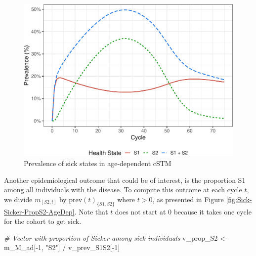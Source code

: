 \documentclass[
]{article}
\newenvironment{Shaded}{\begin{snugshade}}{\end{snugshade}}
\newcommand{\CommentTok}[1]{\textcolor[rgb]{0.56,0.35,0.01}{\textit{#1}}}
\newcommand{\DecValTok}[1]{\textcolor[rgb]{0.00,0.00,0.81}{#1}}
\newcommand{\NormalTok}[1]{#1}
\newcommand{\OtherTok}[1]{\textcolor[rgb]{0.56,0.35,0.01}{#1}}
\newcommand{\SpecialCharTok}[1]{\textcolor[rgb]{0.00,0.00,0.00}{#1}}
\newcommand{\StringTok}[1]{\textcolor[rgb]{0.31,0.60,0.02}{#1}}
\begin{document}
\begin{figure}[H]

{\centering \includegraphics{../figs/Sick-Sicker-Prev-AgeDep-1} 

}

\caption{Prevalence of sick states in age-dependent cSTM}\label{fig:Sick-Sicker-Prev-AgeDep}
\end{figure}

Another epidemiological outcome that could be of interest, is the proportion S1 among all individuals with the disease. To compute this outcome at each cycle \(t\), we divide \(m_{[S2, t]}\) by \(\text{prev}(t)_{\{S1,S2\}}\) where \(t>0\), as presented in Figure \ref{fig:Sick-Sicker-PropS2-AgeDep}. Note that \(t\) does not start at 0 because it takes one cycle for the cohort to get sick.

\begin{Shaded}
\begin{Highlighting}[]
\CommentTok{\# Vector with proportion of Sicker among sick individuals}
\NormalTok{v\_prop\_S2 }\OtherTok{\textless{}{-}}\NormalTok{ m\_M\_ad[}\SpecialCharTok{{-}}\DecValTok{1}\NormalTok{, }\StringTok{"S2"}\NormalTok{] }\SpecialCharTok{/}\NormalTok{ v\_prev\_S1S2[}\SpecialCharTok{{-}}\DecValTok{1}\NormalTok{] }
\end{Highlighting}
\end{Shaded}
\end{document}
